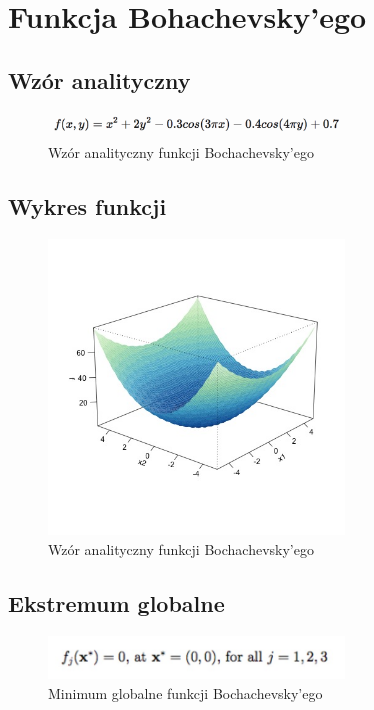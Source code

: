 \documentclass{article}
\begin{document}
     
                 
\clearpage
\section{Funkcja Bohachevsky'ego}
\subsection{Wzór analityczny}
\begin{figure}[!htbp]
    \centering
    \includegraphics[width=0.7\textwidth]{inc/wzory/bohachevsky}
     \caption{Wzór analityczny funkcji Bochachevsky'ego}
    \end{figure}
    
    \subsection{Wykres funkcji}
    \begin{figure}[!htbp]
    \centering
    \includegraphics[width=0.7\textwidth]{inc/wykresyfunkcji/bohachevsky}
     \caption{Wzór analityczny funkcji Bochachevsky'ego}
    \end{figure}
    
    \subsection{Ekstremum globalne}
    
     \begin{figure}[!htbp]
    \centering
    \includegraphics[width=0.7\textwidth]{inc/wzory/bohachevsky-global-minimum}
     \caption{Minimum globalne funkcji Bochachevsky'ego}
    \end{figure}
    
\end{document}
